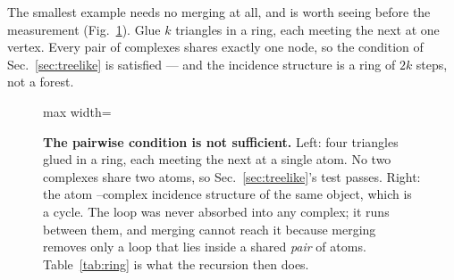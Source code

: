 The smallest example needs no merging at all, and is worth seeing before the
measurement (Fig.~\ref{fig:ring}). Glue $k$ triangles in a ring, each meeting
the next at one vertex. Every pair of complexes shares exactly one node, so the
condition of Sec.~\ref{sec:treelike} is satisfied --- and the incidence
structure is a ring of $2k$ steps, not a forest.

\begin{figure}[t]
\centering
\begin{adjustbox}{max width=\linewidth}
\end{adjustbox}
\caption{\textbf{The pairwise condition is not sufficient.} Left: four triangles
glued in a ring, each meeting the next at a single atom. No two complexes
share two atoms, so Sec.~\ref{sec:treelike}'s test passes. Right: the atom
--complex incidence structure of the same object, which is a cycle. The loop
was never absorbed into any complex; it runs between them, and merging cannot
reach it because merging removes only a loop that lies inside a shared
\emph{pair} of atoms. Table~\ref{tab:ring} is what the recursion then does.}
\label{fig:ring}
\end{figure}

